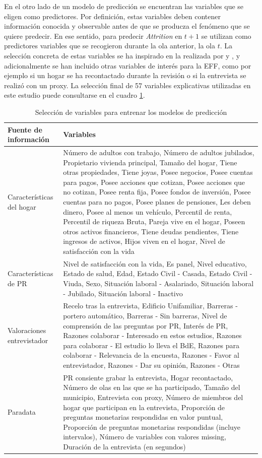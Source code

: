 En el otro lado de un modelo de predicción se encuentran las variables que se eligen como predictores. Por definición, estas variables deben contener información conocida y observable antes de que se producza el fenómeno que se quiere predecir. En ese sentido, para predecir \textit{Attrition} en $t+1$ se utilizan como predictores variables que se recogieron durante la ola anterior, la ola $t$. La selección concreta de estas variables se ha inspirado en la realizada por \cite{beste2023case} y \cite{kern2021predicting}, y adicionalmente se han incluido otras variables de interés para la EFF, como por ejemplo si un hogar se ha recontactado durante la revisión o si la entrevista se realizó con un proxy. La selección final de 57 variables explicativas utilizadas en este estudio puede consultarse en el cuadro \ref{table:vars}.

\begin{table}[htbp]
\centering{}
\begin{tabular}{l p{10cm}}
\hline
\textbf{Fuente de información} & \textbf{Variables} \\ \hline
Características del hogar & Número de adultos con trabajo, Número de adultos jubilados, Propietario vivienda principal, Tamaño del hogar, Tiene otras propiedades, Tiene joyas, Posee negocios, Posee cuentas para pagos, Posee acciones que cotizan, Posee acciones que no cotizan, Posee renta fija, Posee fondos de inversión, Posee cuentas para no pagos, Posee planes de pensiones, Les deben dinero, Posee al menos un vehículo, Percentil de renta, Percentil de riqueza Bruta, Pareja vive en el hogar, Poseen otros activos financieros, Tiene deudas pendientes, Tiene ingresos de activos, Hijos viven en el hogar, Nivel de satisfacción con la vida \\ \hline
Características de PR & Nivel de satisfacción con la vida, Es panel, Nivel educativo, Estado de salud, Edad, Estado Civil - Casada, Estado Civil - Viuda, Sexo, Situación laboral - Asalariado, Situación laboral - Jubilado, Situación laboral - Inactivo \\ \hline
Valoraciones entrevistador & Recelo tras la entrevista, Edificio Unifamiliar, Barreras - portero automático, Barreras - Sin barreras, Nivel de comprensión de las preguntas por PR, Interés de PR, Razones colaborar - Interesado en estos estudios, Razones para colaborar - El estudio lo lleva el BdE, Razones para colaborar - Relevancia de la encuesta, Razones - Favor al entrevistador, Razones - Dar su opinión, Razones - Otras \\ \hline
Paradata & PR consiente grabar la entrevista, Hogar recontactado, Número de olas en las que se ha participado, Tamaño del municipio, Entrevista con proxy, Número de miembros del hogar que participan en la entrevista, Proporción de preguntas monetarias respondidas en valor puntual, Proporción de preguntas monetarias respondidas (incluye intervalos), Número de variables con valores missing, Duración de la entrevista (en segundos) \\ \hline
\end{tabular}
\caption{Selección de variables para entrenar los modelos de predicción}
\label{table:vars}
\end{table}

